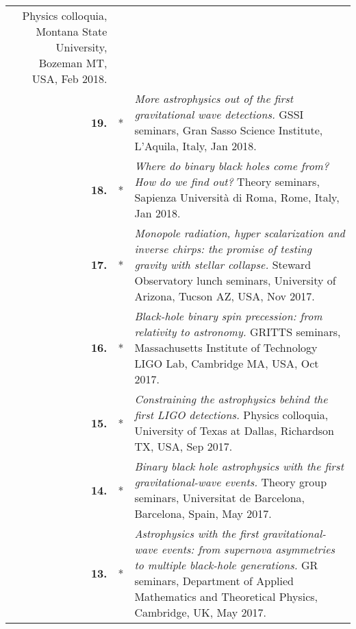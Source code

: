 \documentclass[11pt,letterpaper,sans]{moderncv}   %
\begin{document}
{\begin{longtable}{rp{0.4cm}p{15.8cm}}
\newline{} 
Physics colloquia, Montana State University, Bozeman MT, USA, Feb 2018.
\vspace{0.05cm}\\
%
\textbf{19.} & *& \textit{More astrophysics out of the first gravitational wave detections.}
\newline{} 
GSSI seminars, Gran Sasso Science Institute, L'Aquila, Italy, Jan 2018.
\vspace{0.05cm}\\
%
\textbf{18.} & *& \textit{Where do binary black holes come from? How do we find out?}
\newline{} 
Theory seminars, Sapienza Universit\`a di Roma, Rome, Italy, Jan 2018.
\vspace{0.05cm}\\
%
\textbf{17.} & *& \textit{Monopole radiation, hyper scalarization and inverse chirps: the promise of testing gravity with stellar collapse.}
\newline{} 
Steward Observatory lunch seminars, University of Arizona, Tucson AZ, USA, Nov 2017.
\vspace{0.05cm}\\
%
\textbf{16.} & *& \textit{Black-hole binary spin precession: from relativity to astronomy.}
\newline{} 
GRITTS seminars, Massachusetts Institute of Technology LIGO Lab, Cambridge MA, USA, Oct 2017.
\vspace{0.05cm}\\
%
\textbf{15.} & *& \textit{Constraining the astrophysics behind the first LIGO detections.}
\newline{} 
Physics colloquia, University of Texas at Dallas, Richardson TX, USA, Sep 2017.
\vspace{0.05cm}\\
%
\textbf{14.} & *& \textit{Binary black hole astrophysics with the first gravitational-wave events.}
\newline{} 
Theory group seminars, Universitat de Barcelona, Barcelona, Spain, May 2017.
\vspace{0.05cm}\\
%
\textbf{13.} & *& \textit{Astrophysics with the first gravitational-wave events: from supernova asymmetries to multiple black-hole generations.}
\newline{} 
GR seminars, Department of Applied Mathematics and Theoretical Physics, Cambridge, UK, May 2017.
\vspace{0.05cm}\\

\end{longtable}}
\end{document}
